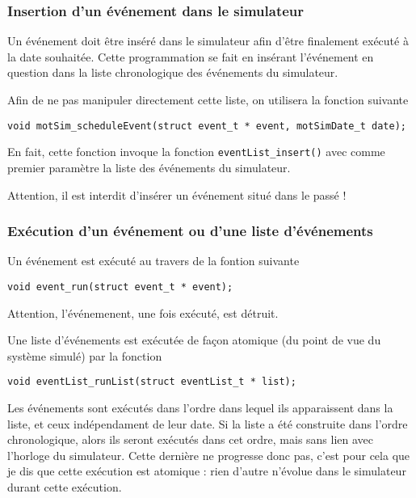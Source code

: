 %
\subsubsection{Insertion d'un événement dans le simulateur}

   Un événement doit être inséré dans le simulateur afin d'être
finalement exécuté à la date souhaitée. Cette programmation se fait en
insérant l'événement en question dans la liste chronologique des
événements du simulateur.

   Afin de ne pas manipuler directement cette liste, on utilisera la
fonction suivante

\begin{verbatim}
void motSim_scheduleEvent(struct event_t * event, motSimDate_t date);
\end{verbatim}

   En fait, cette fonction invoque la fonction
\lstinline!eventList_insert()! avec comme premier paramètre la liste
des événements du simulateur.

   Attention, il est interdit d'insérer un événement situé dans le
passé !

%
\subsubsection{Exécution d'un événement ou d'une liste d'événements}

   Un  événement est exécuté au travers de la fontion suivante

\begin{verbatim}
void event_run(struct event_t * event);
\end{verbatim}

   Attention, l'événemenent, une fois exécuté, est détruit.

   Une liste d'événements est exécutée de façon atomique (du point de
vue du système simulé) par la fonction

\begin{verbatim}
void eventList_runList(struct eventList_t * list);
\end{verbatim}

   Les événements sont exécutés dans l'ordre dans lequel ils
apparaissent dans la liste, et ceux indépendament de leur date. Si la
liste a été construite dans l'ordre chronologique, alors ils seront
exécutés dans cet ordre, mais sans lien avec l'horloge du
simulateur. Cette dernière ne progresse donc pas, c'est pour cela que
je dis que cette exécution est atomique : rien d'autre n'évolue dans
le simulateur durant cette exécution.

